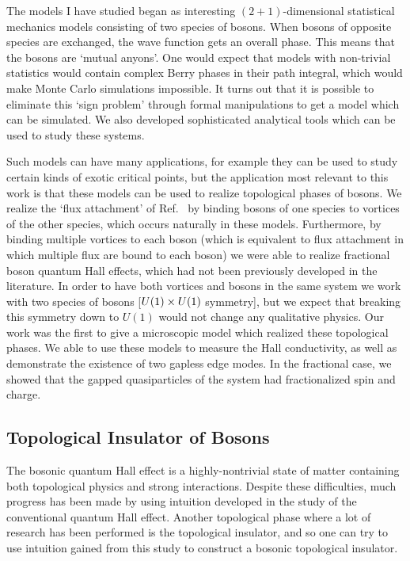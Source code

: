The models I have studied began as interesting $(2+1)$-dimensional statistical mechanics models consisting of two species of bosons. When bosons of opposite species are exchanged, the wave function gets an overall phase. This means that the bosons are `mutual anyons'. One would expect that models with non-trivial statistics would contain complex Berry phases in their path integral, which would make Monte Carlo simulations impossible. It turns out that it is possible to eliminate this `sign problem' through formal manipulations to get a model which can be simulated. We also developed sophisticated analytical tools which can be used to study these systems.

Such models can have many applications, for example they can be used to study certain kinds of exotic critical points, but the application most relevant to this work is that these models can be used to realize topological phases of bosons. We realize the `flux attachment' of Ref.~\cite{SenthilLevin2012} by binding bosons of one species to vortices of the other species, which occurs naturally in these models. Furthermore, by binding multiple vortices to each boson (which is equivalent to flux attachment in which multiple flux are bound to each boson) we were able to realize fractional boson quantum Hall effects, which had not been previously developed in the literature. In order to have both vortices and bosons in the same system we work with two species of bosons [$U(1)\times U(1)$ symmetry], but we expect that breaking this symmetry down to $U(1)$ would not change any qualitative physics. Our work was the first to give a microscopic model which realized these topological phases. We able to use these models to measure the Hall conductivity, as well as demonstrate the existence of two gapless edge modes. In the fractional case, we showed that the gapped quasiparticles of the system had fractionalized spin and charge. 

\subsection{Topological Insulator of Bosons}

The bosonic quantum Hall effect is a highly-nontrivial state of matter containing both topological physics and strong interactions. Despite these difficulties, much progress has been made by using intuition developed in the study of the conventional quantum Hall effect. Another topological phase where a lot of research has been performed is the topological insulator, and so one can try to use intuition gained from this study to construct a bosonic topological insulator.

